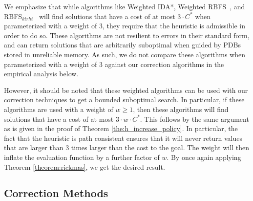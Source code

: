 \documentclass[letterpaper]{article}
\begin{document}
We emphasize that while algorithms like Weighted IDA*, Weighted RBFS~\cite{Korf1992}, and RBFS$_{ktrht}$~\cite{hatem2015recursive} will find solutions that have a cost of at most $3 \cdot C^*$ when parameterized with a weight of $3$, they require that the heuristic is admissible in order to do so. These algorithms are not resilient to errors in their standard form, and can return solutions that are arbitrarily suboptimal when guided by PDBs stored in unreliable memory. As such, we do not compare these algorithms when parameterized with a weight of $3$ against our correction algorithms in the empirical analysis below. 

However, it should be noted that these weighted algorithms can be used with our correction techniques to get a bounded suboptimal search. In particular, if these algorithms are used with a weight of $w \geq 1$, then these algorithms will find solutions that have a cost of at most  $3 \cdot w \cdot C^*$. This follows by the same argument as is given in the proof of Theorem \ref{the:h_increase_policy}. In particular, the fact that the heuristic is path consistent ensures that it will never return values that are larger than $3$ times larger than the cost to the goal. The weight will then inflate the evaluation function by a further factor of $w$. By once again applying Theorem \ref{theorem:rickmas}, we get the desired result.









\subsection{Correction Methods}



\end{document}
